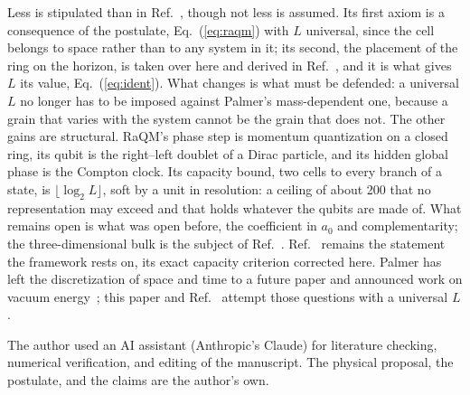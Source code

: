 \documentclass[aps,prd,twocolumn,superscriptaddress,nofootinbib]{revtex4-2}
\begin{document}
Less is stipulated than in Ref.~\cite{korytko2026}, though not less is assumed. Its first axiom is a consequence of the postulate, Eq.~(\ref{eq:raqm}) with $L$ universal, since the cell belongs to space rather than to any system in it; its second, the placement of the ring on the horizon, is taken over here and derived in Ref.~\cite{korytko2026d}, and it is what gives $L$ its value, Eq.~(\ref{eq:ident}). What changes is what must be defended: a universal $L$ no longer has to be imposed against Palmer's mass-dependent one, because a grain that varies with the system cannot be the grain that does not. The other gains are structural. RaQM's phase step is momentum quantization on a closed ring, its qubit is the right--left doublet of a Dirac particle, and its hidden global phase is the Compton clock. Its capacity bound, two cells to every branch of a state, is $\lfloor\log_2 L\rfloor$, soft by a unit in resolution: a ceiling of about 200 that no representation may exceed and that holds whatever the qubits are made of. What remains open is what was open before, the coefficient in $a_0$ and complementarity; the three-dimensional bulk is the subject of Ref.~\cite{korytko2026d}. Ref.~\cite{korytko2026} remains the statement the framework rests on, its exact capacity criterion corrected here. Palmer has left the discretization of space and time to a future paper and announced work on vacuum energy~\cite{palmer2026c}; this paper and Ref.~\cite{korytko2026b} attempt those questions with a universal $L$.


\begin{acknowledgments}
The author used an AI assistant (Anthropic's Claude) for literature checking, numerical verification, and editing of the manuscript. The physical proposal, the postulate, and the claims are the author's own.
\end{acknowledgments}
\end{document}
